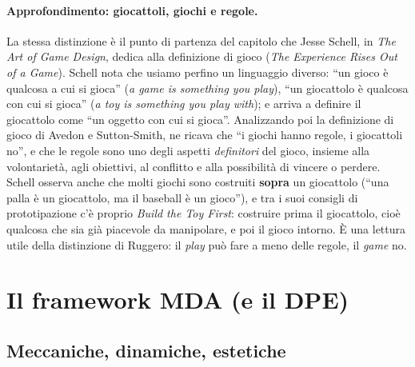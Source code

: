 \paragraph{Approfondimento: giocattoli, giochi e regole.} La stessa distinzione
è il punto di partenza del capitolo che Jesse Schell, in \emph{The Art of Game
Design}, dedica alla definizione di gioco (\emph{The Experience Rises Out of a
Game}). Schell nota che usiamo perfino un linguaggio diverso: ``un gioco è
qualcosa a cui si gioca'' (\emph{a game is something you play}), ``un giocattolo
è qualcosa con cui si gioca'' (\emph{a toy is something you play with}); e
arriva a definire il giocattolo come ``un oggetto con cui si gioca''. Analizzando
poi la definizione di gioco di Avedon e Sutton-Smith, ne ricava che ``i giochi
hanno regole, i giocattoli no'', e che le regole sono uno degli aspetti
\emph{definitori} del gioco, insieme alla volontarietà, agli obiettivi, al
conflitto e alla possibilità di vincere o perdere. Schell osserva anche che
molti giochi sono costruiti \textbf{sopra} un giocattolo (``una palla è un
giocattolo, ma il baseball è un gioco''), e tra i suoi consigli di
prototipazione c'è proprio \emph{Build the Toy First}: costruire prima il
giocattolo, cioè qualcosa che sia già piacevole da manipolare, e poi il gioco
intorno. È una lettura utile della distinzione di Ruggero: il \emph{play} può
fare a meno delle regole, il \emph{game} no.

\section{Il framework MDA (e il DPE)}
\label{a1:sec:mda}

\subsection{Meccaniche, dinamiche, estetiche}



